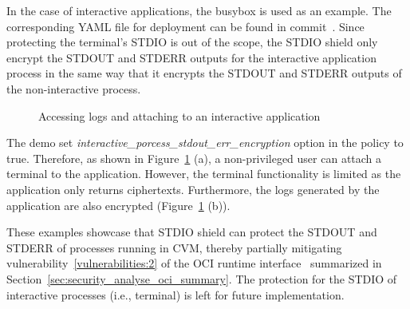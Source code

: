 In the case of interactive applications, the busybox is used as an example. The corresponding YAML file for deployment can be found in commit~\cite*{artifacts_busybox}. Since protecting the terminal's STDIO is out of the scope,  the STDIO shield 
only encrypt the STDOUT and STDERR outputs for the interactive application process in the same way that it encrypts the STDOUT and STDERR outputs of the non-interactive process.
\begin{figure}[!htb]



  \caption[Accessing logs and attaching to an interactive application ]{Accessing logs and attaching to an interactive application}
  \label{fig:qualitativ_interactive_process_stdio}
\end{figure}
The demo set \emph{interactive\_porcess\_stdout\_err\_encryption} option in the policy to true. Therefore, as shown in Figure~\ref{fig:qualitativ_interactive_process_stdio} (a),  a non-privileged user can attach a terminal to the application. However, the terminal functionality is limited as the application only returns 
ciphertexts. Furthermore, the logs generated by the application are also encrypted (Figure~\ref{fig:qualitativ_interactive_process_stdio} (b)). 


These examples showcase that STDIO shield can protect the STDOUT and STDERR of processes running in CVM, thereby partially mitigating vulnerability~\ref{vulnerabilities:2} of the OCI runtime interface~\cite*{oci-runtime-spec} summarized in Section~\ref{sec:security_analyse_oci_summary}. 
The protection for the STDIO of interactive processes (i.e., terminal) is left for future implementation.


